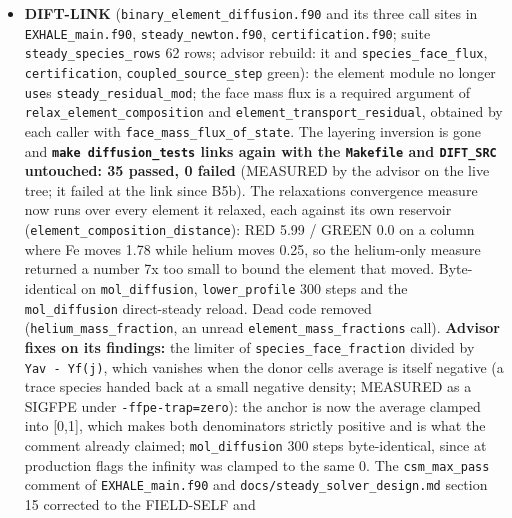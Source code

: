 \documentclass[english,a4paper]{my_memo}
\begin{document}
\begin{itemize}
  the self-field loop runs (a slot per cell would be free,
  \texttt{composition.f90}); \texttt{f\_vib\_quench}/\texttt{e\_vib\_bound} stay at the entry
  composition inside the loop; the COST3 attribution in that report, its
  log entry above and the \texttt{csm\_max\_pass} comment of \texttt{EXHALE\_main.f90} are
  superseded by this measurement (comment to be corrected when DIFT-LINK
  releases main).
\item
  \textbf{DIFT-LINK} (\texttt{binary\_element\_diffusion.f90} and its three call sites in
  \texttt{EXHALE\_main.f90}, \texttt{steady\_newton.f90}, \texttt{certification.f90}; suite
  \texttt{steady\_species\_rows} 62 rows; advisor rebuild: it and \texttt{species\_face\_flux},
  \texttt{certification}, \texttt{coupled\_source\_step} green): the element module no longer
  \texttt{use}s \texttt{steady\_residual\_mod}; the face mass flux is a required argument of
  \texttt{relax\_element\_composition} and \texttt{element\_transport\_residual}, obtained by
  each caller with \texttt{face\_mass\_flux\_of\_state}. The layering inversion is gone
  and \textbf{\texttt{make\ diffusion\_tests} links again with the \texttt{Makefile} and \texttt{DIFT\_SRC}
  untouched: 35 passed, 0 failed} (MEASURED by the advisor on the live
  tree; it failed at the link since B5b). The relaxation\textquotesingle s convergence
  measure now runs over every element it relaxed, each against its own
  reservoir (\texttt{element\_composition\_distance}): RED 5.99 / GREEN 0.0 on a
  column where Fe moves 1.78 while helium moves 0.25, so the helium-only
  measure returned a number 7x too small to bound the element that moved.
  Byte-identical on \texttt{mol\_diffusion}, \texttt{lower\_profile} 300 steps and the
  \texttt{mol\_diffusion} direct-steady reload. Dead code removed
  (\texttt{helium\_mass\_fraction}, an unread \texttt{element\_mass\_fractions} call).
  \textbf{Advisor fixes on its findings:} the limiter of \texttt{species\_face\_fraction}
  divided by \texttt{Yav\ -\ Yf(j)}, which vanishes when the donor cell\textquotesingle s average is
  itself negative (a trace species handed back at a small negative density;
  MEASURED as a SIGFPE under \texttt{-ffpe-trap=zero}): the anchor is now the
  average clamped into {[}0,1{]}, which makes both denominators strictly
  positive and is what the comment already claimed; \texttt{mol\_diffusion} 300
  steps byte-identical, since at production flags the infinity was clamped
  to the same 0. The \texttt{csm\_max\_pass} comment of \texttt{EXHALE\_main.f90} and
  \texttt{docs/steady\_solver\_design.md} section 15 corrected to the FIELD-SELF and

\end{itemize}
\end{document}
